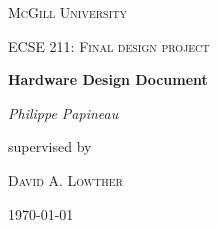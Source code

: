 \documentclass[]{article}
\begin{document}
\hypersetup{
    colorlinks,
    citecolor=black,
    filecolor=black,
    linkcolor=black,
    urlcolor=black
}


\begin{titlepage}
	\centering
	\vspace{1cm}
	{\scshape\LARGE McGill University \par}
	\vspace{1cm}
	{\scshape\Large ECSE 211: Final design project\par}
	\vspace{1.5cm}
	{\huge\bfseries Hardware Design Document\par}
	\vspace{2cm}
	{\Large\itshape Philippe Papineau\par}
	\vfill
	supervised by\par
	 \textsc{David A. Lowther}

	\vfill

	{\large \today\par}
\end{titlepage}

\newpage

\tableofcontents

\newpage
\end{document}
